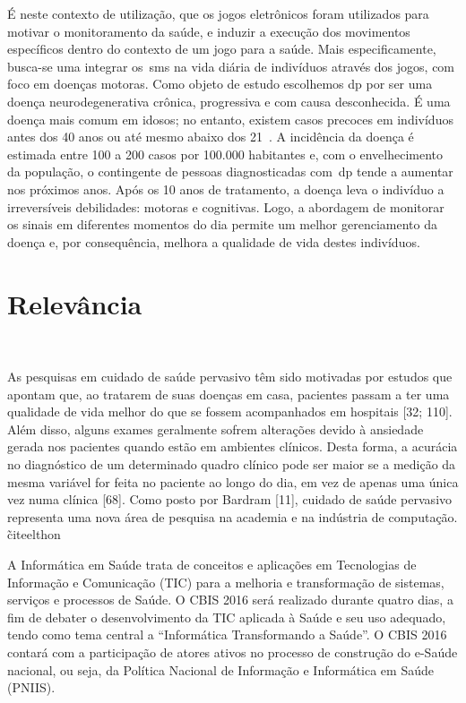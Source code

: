É neste contexto de utilização, que os jogos eletrônicos foram utilizados para motivar o monitoramento da saúde, e induzir a execução dos movimentos específicos dentro do contexto de um jogo para a saúde. Mais especificamente, busca-se uma integrar os~\ac{sms} na vida diária de indivíduos através dos jogos, com foco em doenças motoras. Como objeto de estudo escolhemos \ac{dp} por ser uma doença neurodegenerativa crônica, progressiva e com causa desconhecida. É uma doença mais comum em idosos; no entanto, existem casos precoces em indivíduos antes dos 40 anos ou até mesmo abaixo dos 21~\cite{menezes2003}. A incidência da doença é estimada entre 100 a 200 casos por 100.000 habitantes e, com o envelhecimento da população, o contingente de pessoas diagnosticadas com~\ac{dp} tende a aumentar nos próximos anos. Após os 10 anos de tratamento, a doença leva o indivíduo a irreversíveis debilidades: motoras e cognitivas. Logo, a abordagem de monitorar os sinais em diferentes momentos do dia permite um melhor gerenciamento da doença e, por consequência, melhora a qualidade de vida destes indivíduos.


\section{Relevância}\label{section:relevancia}

~\cite{sbc2016} ~\cite{ieee2016}

As pesquisas em cuidado de saúde pervasivo têm sido motivadas por estudos que apontam
que, ao tratarem de suas doenças em casa, pacientes passam a ter uma qualidade de vida
melhor do que se fossem acompanhados em hospitais [32; 110]. Além disso, alguns exames
geralmente sofrem alterações devido à ansiedade gerada nos pacientes quando estão em
ambientes clínicos. Desta forma, a acurácia no diagnóstico de um determinado quadro clínico
pode ser maior se a medição da mesma variável for feita no paciente ao longo do dia, em vez
de apenas uma única vez numa clínica [68].
Como posto por Bardram [11], cuidado de saúde pervasivo representa uma nova área
de pesquisa na academia e na indústria de computação. \~cite{elthon}


A Informática em Saúde trata de conceitos e aplicações em Tecnologias de Informação e Comunicação (TIC) para a melhoria e transformação de sistemas, serviços e processos de Saúde. O CBIS 2016 será realizado durante quatro dias, a fim de debater o desenvolvimento da TIC aplicada à Saúde e seu uso adequado, tendo como tema central a “Informática Transformando a Saúde”. O CBIS 2016 contará com a participação de atores ativos no processo de construção do e-Saúde nacional, ou seja, da Política Nacional de Informação e Informática em Saúde (PNIIS).~\cite{cbis2016}

